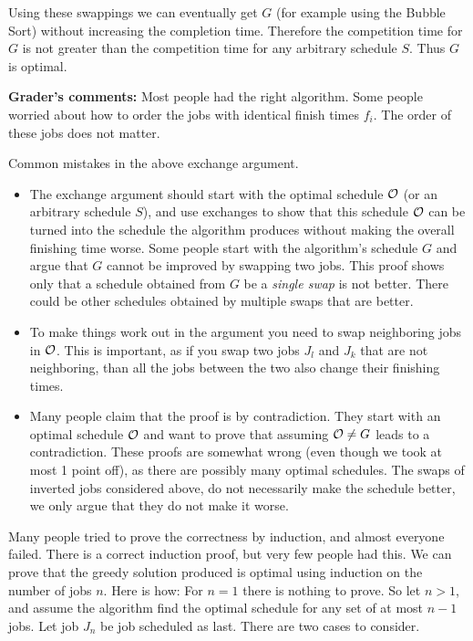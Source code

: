\documentclass[12pt]{article}
\begin{document}
\begin{enumerate}
{Using these swappings we can eventually get $G$ (for example using the Bubble Sort)
without increasing the completion time.
Therefore the competition time for $G$ is not greater than
the competition time for any arbitrary schedule $S$.
Thus $G$ is optimal.

\bigskip

{\bf Grader's comments:}
Most people had the right algorithm. Some people worried about how to
order the jobs with identical finish times $f_i$. The order of these
jobs does not matter.

Common mistakes in the above exchange argument.
\begin{itemize}
\item
The exchange argument should start with the optimal schedule ${\cal O}$ (or
an arbitrary schedule $S$), and
use exchanges to show that this schedule ${\cal O}$ can be turned into the
schedule the algorithm produces without making the overall finishing time
worse. Some people start with the algorithm's schedule $G$ and argue that
$G$ cannot be improved by swapping two jobs. This proof shows only that
a schedule obtained from $G$ be a {\em single swap} is not better. There
could be
other schedules obtained by multiple swaps that are better.
\item To make things work out in the argument you need to swap
neighboring jobs in  ${\cal O}$. This is important, as if you swap two jobs
$J_l$ and $J_k$ that are not neighboring, than all the jobs between the two
also change their finishing times.
\item Many people claim that the proof is by contradiction. They start with
an optimal schedule ${\cal O}$ and want to prove that assuming
${\cal O} \neq G$ leads to a contradiction. These proofs are somewhat wrong
(even though we took at most 1 point off), as there are possibly many optimal
schedules. The swaps of inverted jobs considered above, do not necessarily
make the schedule better, we only argue that they do not make it worse.
\end{itemize}

\medskip

Many people tried to prove the correctness by induction, and almost everyone
failed. There is a correct induction proof, but very few people had this.
We can prove that the greedy solution produced is optimal using induction on the
number of jobs $n$. Here is how:
For $n=1$ there is nothing to prove. So let
$n>1$, and assume the algorithm
find the optimal schedule for any set of at most $n-1$ jobs.
Let job $J_n$ be job scheduled as last. There are two cases to consider.

}
\end{enumerate}
\end{document}
